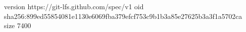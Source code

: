 version https://git-lfs.github.com/spec/v1
oid sha256:899ed55854081e1130e6069fba379efcf753c9b1b3a85e27625b3a3f1a5702ca
size 7400
